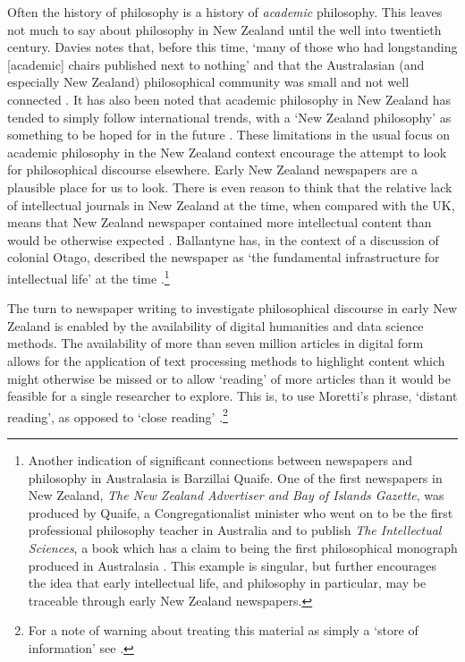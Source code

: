 \documentclass{article}
\begin{document}
Often the history of philosophy is a history of \textit{academic} philosophy. This leaves not much to say about philosophy in New Zealand until the well into twentieth century. Davies notes that, before this time, ‘many of those who had longstanding [academic] chairs published next to nothing’ and that the Australasian (and especially New Zealand) philosophical community was small and not well connected \cite[24]{davies-2014}. It has also been noted that academic philosophy in New Zealand has tended to simply follow international trends, with a `New Zealand philosophy' as something to be hoped for in the future \cite[ix--x]{oddie-1992}. These limitations in the usual focus on academic philosophy in the New Zealand context encourage the attempt to look for philosophical discourse elsewhere. Early New Zealand newspapers are a plausible place for us to look.
There is even reason to think that the relative lack of intellectual journals in New Zealand at the time, when compared with the UK, means that New Zealand newspaper contained more intellectual content than would be otherwise expected \cite[37]{crane-2013} \cite{ballantyne-2012}. Ballantyne has, in the context of a discussion of colonial Otago, described the newspaper as `the fundamental infrastructure for intellectual life' at the time \cite[57]{ballantyne-2012}.\footnote{
Another indication of significant connections between newspapers and philosophy in Australasia is Barzillai Quaife. One of the first newspapers in New Zealand, \textit{The New Zealand Advertiser and Bay of Islands Gazette}, was produced by Quaife, a Congregationalist minister who went on to be the first professional philosophy teacher in Australia and to publish \textit{The Intellectual Sciences}, a book which has a claim to being the first philosophical monograph produced in Australasia \cite[16--17]{davies-2014}. This example is singular, but further encourages the idea that early intellectual life, and philosophy in particular, may be traceable through early New Zealand newspapers.}

The turn to newspaper writing to investigate philosophical discourse in early New Zealand is enabled by the availability of digital humanities and data science methods. The availability of more than seven million articles in digital form allows for the application of text processing methods to highlight content which might otherwise be missed or to allow `reading' of more articles than it would be feasible for a single researcher to explore. This is, to use Moretti's phrase, `distant reading', as opposed to `close reading' \cite[47--49]{moretti}.\footnote{For a note of warning about treating this material as simply a `store of information' see \cite[59-60]{ballantyne-2012}.}
\end{document}
